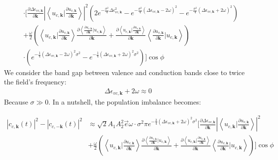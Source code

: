 \begin{equation}
\begin{aligned}
    &\cdot[\frac{\partial  \Delta \epsilon_{vc,\mathbf k}}{\partial \mathbf k} |\left \langle u_{c,\mathbf k}\Big |\frac{\partial u_{v,\mathbf k}}{\partial \mathbf k} \right \rangle|^2 (2e^{-\frac{\sigma^2}{4} \Delta \epsilon_{vc,\mathbf k} ^2}-e^{-\frac{\sigma^2}{4} (\Delta \epsilon_{vc,\mathbf k}-2\omega )^2}-e^{-\frac{\sigma^2}{4} (\Delta \epsilon_{vc,\mathbf k}+2\omega )^2})\\
    &+\frac{\omega }{2} (\left \langle u_{c,\mathbf k} \big | \frac{\partial u_{v,\mathbf k}}{\partial \mathbf k}  \right \rangle \frac{\partial{\left \langle\frac{\partial u_{v,\mathbf k}}{\partial \mathbf k}\Big |u_{c,\mathbf k}\right \rangle}}{\partial {\mathbf k}} +
   \frac{\partial{\left \langle u_{c,\mathbf k}\Big |\frac{\partial u_{v,\mathbf k}}{\partial \mathbf k} \right \rangle}}{\partial {\mathbf k}}
    \left \langle \frac{\partial u_{v,\mathbf k}}{\partial \mathbf k} |  u_{c,\mathbf k} \right \rangle)\\
    &\cdot(e^{-\frac{1}{4}(\Delta \epsilon_{vc,\mathbf k} - 2\omega )^2 \sigma^2}
    -e^{-\frac{1}{4}(\Delta \epsilon_{vc,\mathbf k} + 2\omega )^2 \sigma^2})]\cos\phi
    \end{aligned}
\end{equation}
We consider the band gap between valence and conduction bands close to twice the field's frequency:
\begin{align}
\Delta \epsilon_{vc,\mathbf k}+2\omega \approx0    
\end{align}
Because $\sigma\gg 0$. In a nutshell, the population imbalance becomes:

\begin{equation}
    \begin{aligned}
 |c_{c,\mathbf k}(t)|^2-|c_{c,-\mathbf k}(t)|^2&\approx\sqrt{2} A_1 A_2^2 \vec e \omega  \cdot \sigma^2 \pi e^{-\frac{3}{4}(\Delta \epsilon_{vc,\mathbf k} + 2\omega )^2 \sigma^2}[\frac{\partial  \Delta \epsilon_{vc,\mathbf k}}{\partial \mathbf k} |\left \langle u_{c,\mathbf k}\Big |\frac{\partial u_{v,\mathbf k}}{\partial \mathbf k} \right \rangle|^2 \\
    &+\frac{\omega }{2} (\left \langle u_{c,\mathbf k} \big | \frac{\partial u_{v,\mathbf k}}{\partial \mathbf k}  \right \rangle \frac{\partial{\left \langle\frac{\partial u_{v,\mathbf k}}{\partial \mathbf k}\Big |u_{c,\mathbf k}\right \rangle}}{\partial {\mathbf k}} +
   \frac{\partial{\left \langle u_{c,\mathbf k}\Big |\frac{\partial u_{v,\mathbf k}}{\partial \mathbf k} \right \rangle}}{\partial {\mathbf k}}
    \left \langle \frac{\partial u_{v,\mathbf k}}{\partial \mathbf k} |  u_{c,\mathbf k} \right \rangle)]\cos\phi
    \end{aligned}
\label{perturbationresult}
\end{equation}


